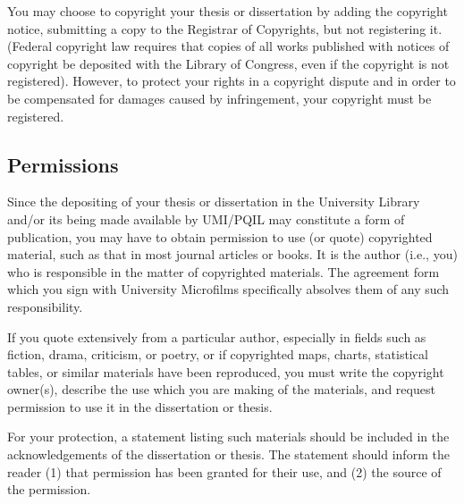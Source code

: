 You may choose to copyright your thesis or dissertation by adding the copyright notice, submitting a copy to the Registrar of Copyrights, but not registering it. (Federal copyright law requires that copies of all works published with notices of copyright be deposited with the Library of Congress, even if the copyright is not registered). However, to protect your rights in a copyright dispute and in order to be compensated for damages caused by infringement, your copyright must be registered.

\subsection{Permissions}
%
Since the depositing of your thesis or dissertation in the University Library and/or its being made available by UMI/PQIL may constitute a form of publication, you may have to obtain permission to use (or quote) copyrighted material, such as that in most journal articles or books. It is the author (i.e., you) who is responsible in the matter of copyrighted materials. The agreement form which you sign with University Microfilms specifically absolves them of any such responsibility.

If you quote extensively from a particular author, especially in fields such as fiction, drama, criticism, or poetry, or if copyrighted maps, charts, statistical tables, or similar materials have been reproduced, you must write the copyright owner(s), describe the use which you are making of the materials, and request permission to use it in the dissertation or thesis.

For your protection, a statement listing such materials should be included in the acknowledgements of the dissertation or thesis. The statement should inform the reader (1) that permission has been granted for their use, and (2) the source of the permission.

